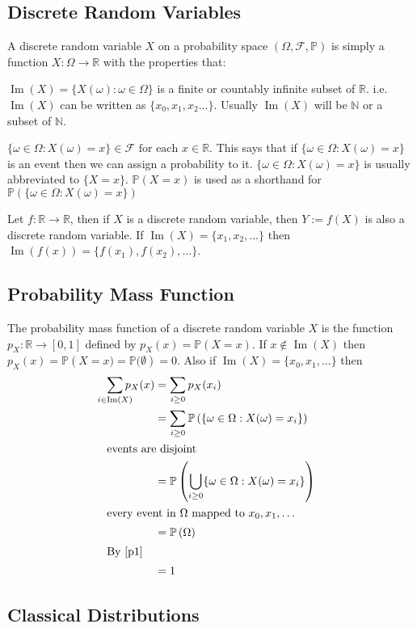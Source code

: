 \documentclass[fontsize=10pt]{article}
\numberwithin{equation}{subsection}
\newcommand{\PP}[1]{\mathbb{P}\left(#1\right)}
\newcommand{\image}{\mathop{\mathrm{Im}}}
\newcommand{\setreal}{\mathbb{R}}
\newcommand{\FF}{\mathcal{F}}
\begin{document}
\begin{multicols}{2}
\subsection{Discrete Random Variables}
A discrete random variable $X$ on a probability space $(\Omega,\FF,\mathbb{P})$ is simply a function $X:\Omega\to\setreal$ with the properties that:
\begin{itemize*}
\item $\image(X)=\{X(\omega):\omega\in\Omega\}$ is a finite or countably infinite subset of $\setreal$. i.e. $\image(X)$ can be written as $\{x_0,x_1,x_2\ldots\}$.  Usually $\image(X)$ will be $\mathbb{N}$ or a subset of $\mathbb{N}$.
\item $\{\omega\in\Omega:X(\omega)=x\}\in\mathcal{F}\text{ for each }x\in\setreal$.  This says that if $\{\omega\in\Omega:X(\omega)=x\}$ is an event then we can assign a probability to it. $\{\omega\in\Omega:X(\omega)=x\}$ is usually abbreviated to $\{X=x\}$. $\PP{X=x}$ is used as a shorthand for $\PP{\{\omega\in\Omega:X(\omega)=x\}}$
\item Let $f:\setreal\to\setreal$, then if $X$ is a discrete random variable, then $Y:=f\left(X\right)$ is also a discrete random variable.  If $\image(X)=\{x_1,x_2,\ldots\}$ then $\image\left(f\left(x\right)\right)=\{f\left(x_1\right),f\left(x_2\right),\ldots\}$.
\end{itemize*}
\subsection{Probability Mass Function}
The probability mass function of a discrete random variable $X$ is the function $p_X:\setreal\to\left[0,1\right]$ defined by $p_X(x)=\PP{X=x}$.  If $x\not\in\image(X)$ then $p_X(x)=\PP{X=x)=\mathbb{P}(\emptyset}=0$.  Also if $\image(X)=\{x_0,x_1,\ldots\}$ then 
\begin{align*}
\sum_{\mathclap{i\in\image(X)}}p_X(x)&=\sum_{i\ge0}p_X(x_i)\\
&=\sum_{i\ge0}\PP{\{\omega\in\Omega:X(\omega)=x_i\}}\\
\intertext{events are disjoint}&=\PP{\bigcup_{i\ge0}\{\omega\in\Omega:X(\omega)=x_i\}}\\
\intertext{every event in $\Omega$ mapped to $x_0,x_1,\ldots$}&=\PP{\Omega}\\
\intertext{By \eqref{p1}}&=1
\end{align*}
\subsection{Classical Distributions}

\end{multicols}
\end{document}

